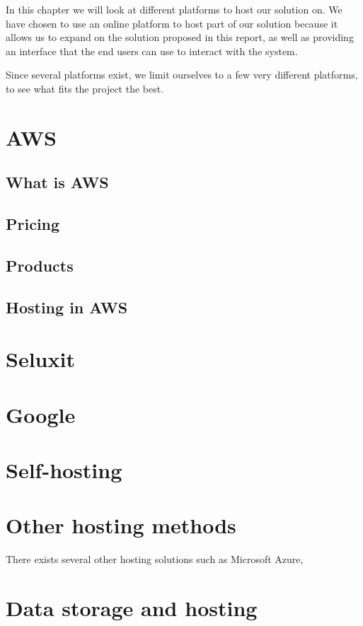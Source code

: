 In this chapter we will look at different platforms to host our solution on. We have chosen to use an online platform to host part of our solution because it allows us to expand on the solution proposed in this report, as well as providing an interface that the end users can use to interact with the system.

Since several platforms exist, we limit ourselves to a few very different platforms, to see what fits the project the best.

\section{AWS}

\subsection{What is AWS}
\subsection{Pricing}
\subsection{Products}
\subsection{Hosting in AWS}

\section{Seluxit}

\section{Google}

\section{Self-hosting}

\section{Other hosting methods}
There exists several other hosting solutions such as Microsoft Azure, 


\section{Data storage and hosting}
